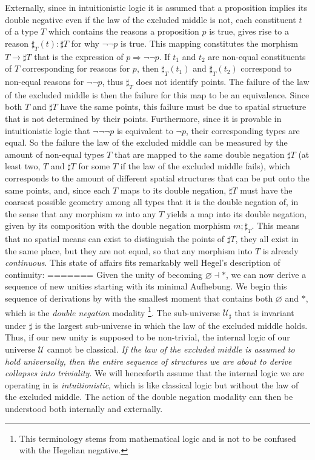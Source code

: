 \documentclass{article}
\begin{document}
Externally, since in intuitionistic logic it is assumed that a proposition implies its double negative even 
if the law of the excluded middle is not, each constituent $t$ of a type $T$ which contains the reasons a 
proposition $p$ is true, gives rise to a reason $\sharp_T (t):\sharp T$ for why $\neg\neg p$ is true. This 
mapping constitutes the morphism $T \rightarrow \sharp T$ that is the expression of $p\Rightarrow\neg\neg p$.
If $t_1$ and $t_2$ are non-equal constituents of $T$ corresponding for reasons for $p$, then $\sharp_T (t_1)$
and $\sharp_T (t_2)$ correspond to non-equal reasons for $\neg\neg p$, thus $\sharp_T$ does not identify 
points. The failure of the law of the excluded middle is then the failure for this map to be an equivalence. 
Since both $T$ and $\sharp T$ have the same points, this failure must be due to spatial structure that is not
determined by their points. Furthermore, since it is provable in intuitionistic logic that $\neg\neg\neg p$ 
is equivalent to $\neg p$, their corresponding types are equal. So the failure the law of the excluded middle
can be measured by the amount of non-equal types $T$ that are mapped to the same double negation $\sharp T$ 
(at least two, $T$ and $\sharp T$ for some $T$ if the law of the excluded middle fails), which corresponds to
the amount of different spatial structures that can be put onto the same points, and, since each $T$ maps to
its double negation, $\sharp T$ must have the coarsest possible geometry among all types that it is the
double negation of, in the sense that any morphism $m$ into any $T$ yields a map into its double negation,
given by its composition with the double negation morphism $m;\sharp_T$. This means that no spatial means can
exist to distinguish the points of $\sharp T$, they all exist in the same place, but they are not equal, so
that any morphism into $T$ is already \emph{continuous}. This state of affairs fits remarkably well Hegel's
description of continuity:
=======
Given the unity of becoming $\varnothing\dashv *$, we can now derive a sequence of new unities starting
with its minimal Aufhebung. We begin this sequence of derivations by with the smallest moment that contains
both $\varnothing$ and $*$, which is the \emph{double negation} modality\cite{Sketches} \footnote{This
terminology stems from mathematical logic and is not to be confused with the Hegelian negative.}. The
sub-universe $\mathcal{U}_\sharp$ that is invariant under $\sharp$ is the largest sub-universe in which
the law of the excluded middle holds. Thus, if our new unity is supposed to be non-trivial, the internal
logic of our universe $\mathcal{U}$ cannot be classical. \emph{If the law of the excluded middle is assumed
to hold universally, then the entire sequence of structures we are about to derive collapses into triviality}.
We will henceforth assume that the internal logic we are operating in is \emph{intuitionistic}, which
is like classical logic but without the law of the excluded middle. The action of the double negation
modality can then be understood both internally and externally. \\
\end{document}
